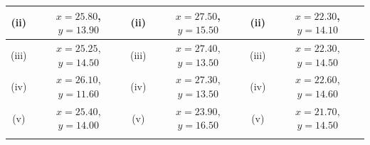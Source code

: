 \documentclass[12pt]{article}
\begin{document}
\begin{tabular}{||c|c||c|c||c|c||}
					\hline (ii)  & $x= 25.80$, $y = 13.90$  & (ii) & $x= 27.50 $, $y= 15.50$ & (ii) & $x= 22.30$, $y = 14.10$ \\  \hline
					\hline (iii) & $x= 25.25$, $y= 14.50 $   & (iii) & $x= 27.40$, $y= 13.50$ &(iii) & $x= 22.30$, $y= 14.50$ \\  \hline
					\hline (iv)  & $x= 26.10$, $y = 11.60$  & (iv) & $x= 27.30$, $y= 13.50$ & (iv)  & $x= 22.60 $, $y = 14.60$\\  \hline
					\hline (v) & $x= 25.40$, $y = 14.00$ & (v)  & $x= 23.90$, $y = 16.50 $ & (v) & $x= 21.70$, $y= 14.50$\\  \hline
					\hline 
					& & & & & \\ \hline
				\end{tabular} 
			
\end{document}
